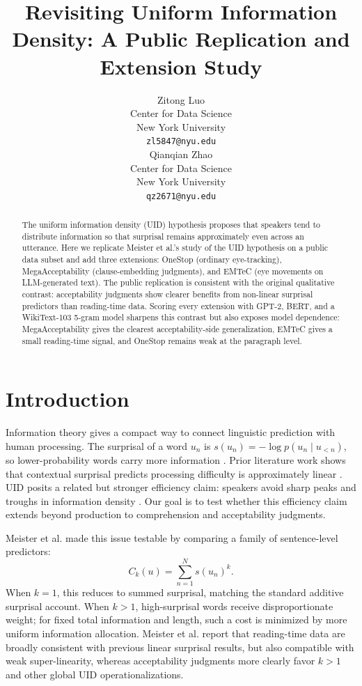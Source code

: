 \documentclass{article}
\title{Revisiting Uniform Information Density: A Public Replication and Extension Study}
\author{%
  Zitong Luo \\
  Center for Data Science\\
  New York University\\
  \texttt{zl5847@nyu.edu} \\
  \And
  Qianqian Zhao \\
  Center for Data Science\\
  New York University\\
  \texttt{qz2671@nyu.edu} \\
}
\begin{document}
\maketitle

\begin{abstract}
The uniform information density (UID) hypothesis proposes that speakers tend to distribute information so that surprisal remains approximately even across an utterance. Here we replicate Meister et al.'s study of the UID hypothesis on a public data subset and add three extensions: OneStop (ordinary eye-tracking), MegaAcceptability (clause-embedding judgments), and EMTeC (eye movements on LLM-generated text). The public replication is consistent with the original qualitative contrast: acceptability judgments show clearer benefits from non-linear surprisal predictors than reading-time data. Scoring every extension with GPT-2, BERT, and a WikiText-103 5-gram model sharpens this contrast but also exposes model dependence: MegaAcceptability gives the clearest acceptability-side generalization, EMTeC gives a small reading-time signal, and OneStop remains weak at the paragraph level.
\end{abstract}

\section{Introduction}

Information theory gives a compact way to connect linguistic prediction with human processing. The surprisal of a word $u_n$ is $s(u_n)=-\log p(u_n \mid u_{<n})$, so lower-probability words carry more information \cite{shannon1948,hale2001,levy2008}. Prior literature work shows that contextual surprisal predicts processing difficulty is approximately linear \cite{smithLevy2013,goodkind2018}. UID posits a related but stronger efficiency claim: speakers avoid sharp peaks and troughs in information density \cite{levyJaeger2007}. Our goal is to test whether this efficiency claim extends beyond production to comprehension and acceptability judgments.

Meister et al. \cite{meister2021} made this issue testable by comparing a family of sentence-level predictors:
\begin{equation}
  C_k(u)=\sum_{n=1}^{N} s(u_n)^k .
  \label{eq:power}
\end{equation}
When $k=1$, this reduces to summed surprisal, matching the standard additive surprisal account. When $k>1$, high-surprisal words receive disproportionate weight; for fixed total information and length, such a cost is minimized by more uniform information allocation. Meister et al. report that reading-time data are broadly consistent with previous linear surprisal results, but also compatible with weak super-linearity, whereas acceptability judgments more clearly favor $k>1$ and other global UID operationalizations.
\end{document}
